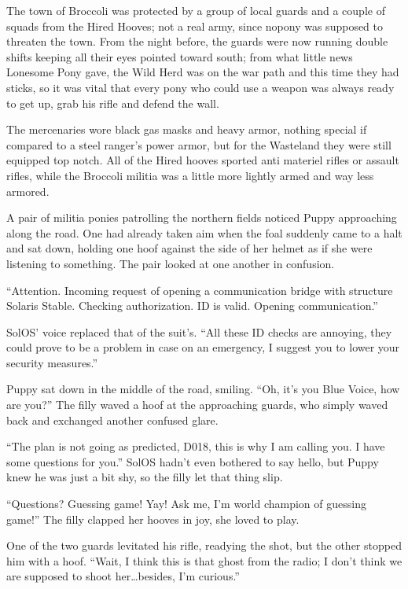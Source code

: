 \horizonline


The town of Broccoli was protected by a group of local guards and a couple of squads from the Hired Hooves; not a real army, since nopony was supposed to threaten the town. From the night before, the guards were now running double shifts keeping all their eyes pointed toward south; from what little news Lonesome Pony gave, the Wild Herd was on the war path and this time they had sticks, so it was vital that every pony who could use a weapon was always ready to get up, grab his rifle and defend the wall.

The mercenaries wore black gas masks and heavy armor, nothing special if compared to a steel ranger's power armor, but for the Wasteland they were still equipped top notch. All of the Hired hooves sported anti materiel rifles or assault rifles, while the Broccoli militia was a little more lightly armed and way less armored.

A pair of militia ponies patrolling the northern fields noticed Puppy approaching along the road. One had already taken aim when the foal suddenly came to a halt and sat down, holding one hoof against the side of her helmet as if she were listening to something. The pair looked at one another in confusion.

``Attention. Incoming request of opening a communication bridge with structure Solaris Stable. Checking authorization. ID is valid. Opening communication.''

SolOS' voice replaced that of the suit's. ``All these ID checks are annoying, they could prove to be a problem in case on an emergency, I suggest you to lower your security measures.''

Puppy sat down in the middle of the road, smiling. ``Oh, it's you Blue Voice, how are you?'' The filly waved a hoof at the approaching guards, who simply waved back and exchanged another confused glare.

``The plan is not going as predicted, D018, this is why I am calling you. I have some questions for you.'' SolOS hadn't even bothered to say hello, but Puppy knew he was just a bit shy, so the filly let that thing slip.

``Questions? Guessing game! Yay! Ask me, I'm world champion of guessing game!'' The filly clapped her hooves in joy, she loved to play.

One of the two guards levitated his rifle, readying the shot, but the other stopped him with a hoof. ``Wait, I think this is that ghost from the radio; I don't think we are supposed to shoot her\dots besides, I'm curious.''

